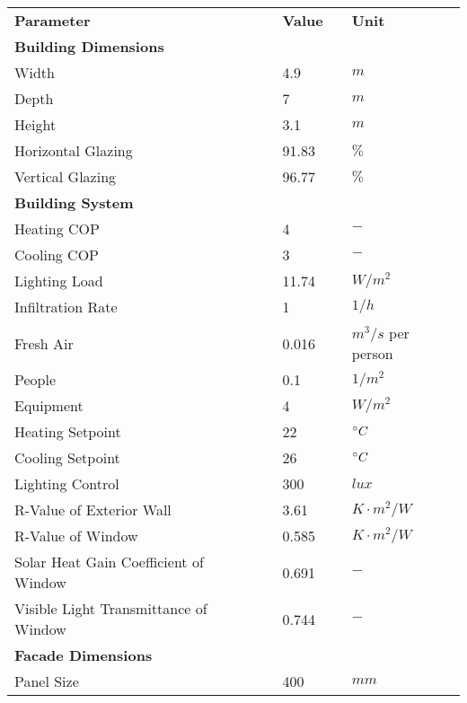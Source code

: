 		\begin{table}[h!]
		\label{t:parameters}
			\begin{center}
		    \begin{tabular}{lllll}
		    \bf Parameter            	&& \bf Value 	&& \bf Unit \\ \specialrule{.1em}{.2em}{.2em} 
		    \bf Building Dimensions 	&& ~     		&& ~    \\ \hline
		    Width 		         		&& 4.9    		&& $m$    \\
		    Depth          				&& 7     		&& $m$    \\
		    Height          			&& 3.1     		&& $m$    \\
		    Horizontal Glazing    		&& 91.83     	&& $\%$    \\
		    Vertical Glazing    		&& 96.77     	&& $\%$    \\ \hline
		    \bf Building System 		&& ~     		&& ~    \\ \hline
		    Heating COP          		&& 4     		&& $-$    \\
		    Cooling COP          		&& 3     		&& $-$    \\
		    Lighting Load          		&& 11.74     	&& $W/m^2$    \\
		    Infiltration Rate \cite{porges2001} && 1 	&& $1/h$    \\
		    Fresh Air \cite{porges2001} && 0.016		&& $m^3/s$ per person    \\
		    People		          		&& 0.1     		&& $1/m^2$    \\
		    Equipment	          		&& 4     		&& $W/m^2$    \\
		    Heating Setpoint          	&& 22     		&& $\degree C$    \\
		    Cooling Setpoint       		&& 26     		&& $\degree C$   \\
		    Lighting Control       		&& 300     		&& $lux$    \\ 
		    R-Value of Exterior Wall 	&& 3.61     	&& $K\cdot m^2/W$    \\
		    R-Value of Window	 		&& 0.585     	&& $K\cdot m^2/W$    \\ 
		    Solar Heat Gain Coefficient of Window	 		
		    							&& 0.691     	&& $-$    \\
		    Visible Light Transmittance of Window
		    					 		&& 0.744     	&& $-$    \\ \hline
		    \bf Facade Dimensions 		&& ~     		&& ~    \\ \hline
		    Panel Size          		&& 400     		&& $mm$    \\

\end{tabular}
\end{center}
\end{table}
